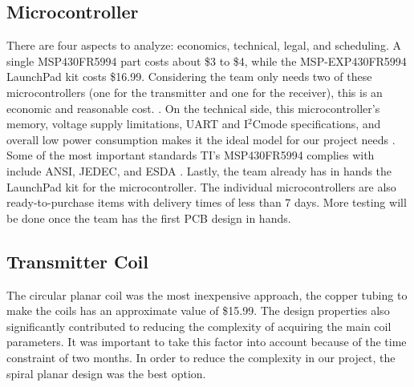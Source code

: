 \documentclass[12pt]{article}
\begin{document}
\pagebreak

\subsection{Microcontroller}

\indent \indent
There are four aspects to analyze: economics, technical, legal, and scheduling. A single MSP430FR5994 part costs about \$3 to \$4, while the MSP-EXP430FR5994 LaunchPad kit costs \$16.99. Considering the team only needs two of these microcontrollers (one for the transmitter and one for the receiver), this is an economic and reasonable cost. \cite{MSP430FR599x}  \cite{testKit}. On the technical side, this microcontroller’s memory, voltage supply limitations, UART and I$^2$Cmode specifications, and overall low power consumption makes it the ideal model for our project needs \cite{MSP430FR599x}. Some of the most important standards TI’s MSP430FR5994 complies with include ANSI, JEDEC, and ESDA \cite{MSP430FR599x}. Lastly, the team already has in hands the LaunchPad kit for the microcontroller. The individual microcontrollers are also ready-to-purchase items with delivery times of less than 7 days. More testing will be done once the team has the first PCB design in hands.


\subsection{Transmitter Coil}


\indent \indent
The circular planar coil was the most inexpensive approach, the copper tubing to make the coils has an approximate value of  \$15.99. The design properties also significantly contributed to reducing the complexity of acquiring the main coil parameters. It was important to take this factor into account because of the time constraint of two months. In order to reduce the complexity in our project, the spiral planar design was the best option.\\
\end{document}
